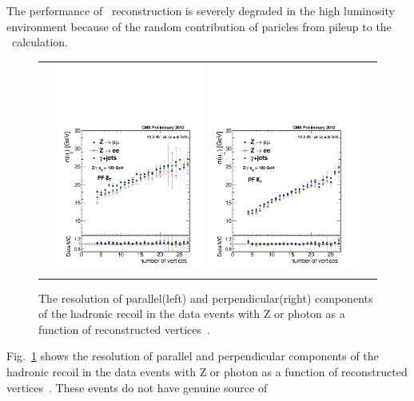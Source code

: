 The performance of \met\ reconstruction is severely degraded 
in the high luminosity environment because of the random contribution of paricles 
from pileup to the \met\ calculation. 
\begin{figure}[htp] 
\centering 
\begin{tabular}{c} 
\includegraphics[width=0.45\textwidth]{figures/Fig11PFresoNVW_para_fit.pdf} 
\includegraphics[width=0.45\textwidth]{figures/Fig11PFresoNVW_perp_fit.pdf} 
\end{tabular} 
\caption{The resolution of parallel(left) and perpendicular(right) components of the
hadronic recoil in the data events with Z or photon as a function of reconstructed
vertices~\cite{CMS-PAS-JME-12-002}.} 
\label{fig:metres} 
\end{figure} 
Fig.~\ref{fig:metres} shows the resolution of parallel and perpendicular components of 
the hadronic recoil in the data events with Z or photon as a function of reconstructed 
vertices~\cite{CMS-PAS-JME-12-002}. These events do not have genuine source of 
